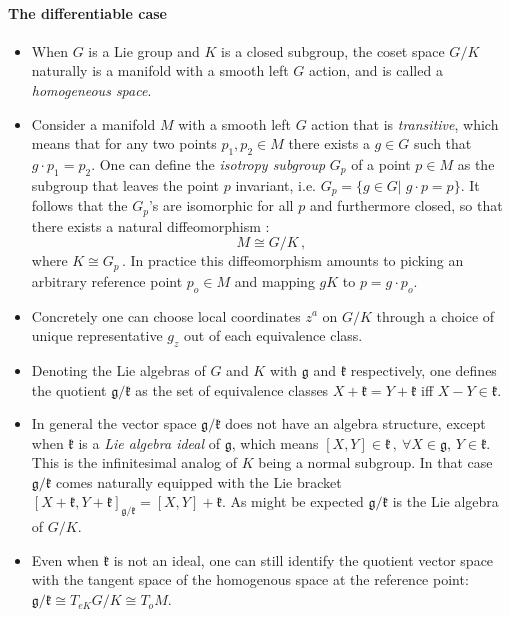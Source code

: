 \documentclass[11pt,a4paper]{article}
\begin{document}
    \paragraph{The differentiable case}
    \begin{itemize}
    	\item When $G$ is a Lie group and $K$ is a closed subgroup, the coset space $G/K$ naturally is a manifold with a smooth left $G$ action, and is called a {\it homogeneous space}.
    	
    	\item  Consider a manifold $M$ with a smooth left $G$ action that is {\it transitive}, which means that for any two points $p_1, p_2\in M$ there exists a $g\in G$ such that $g\cdot p_1=p_2$. One can define the {\it isotropy subgroup} $G_p$ of a point $p \in M$ as the subgroup that leaves the point $p$ invariant, i.e. $G_p=\{g\in G|\;g\cdot p=p\}$. It follows that the $G_p$'s are isomorphic for all $p$ and furthermore closed, so that there exists a natural diffeomorphism :
    	\begin{equation}
    	M\cong G/K\,,
    	\end{equation}
    	where $K\cong G_p$\,. In practice this diffeomorphism amounts to picking an arbitrary reference point $p_o\in M$ and mapping $gK$ to $p=g\cdot p_o$. 
    	\item Concretely one can choose local coordinates $z^a$ on $G/K$ through a choice of unique representative $g_z$ out of each equivalence class.
    	\item Denoting the Lie algebras of $G$ and $K$ with $\mathfrak{g}$ and $\mathfrak{k}$ respectively, one defines the quotient $\mathfrak{g}/\mathfrak{k}$ as the set of equivalence classes $X+\mathfrak{k}=Y+\mathfrak{k}$ iff $ X-Y \in \mathfrak{k}$.
    	\item In general the vector space $\mathfrak{g}/\mathfrak{k}$ does not have an algebra structure, except when $\mathfrak{k}$ is a {\it Lie algebra ideal} of $\mathfrak{g}$, which means $[X,Y]\in \mathfrak{k}\,,\ \forall X\in \mathfrak{g}$, $Y\in \mathfrak{k}$. This is the infinitesimal analog of $K$ being a normal subgroup. In that case $\mathfrak{g}/\mathfrak{k}$ comes naturally  equipped with the Lie bracket $[X+\mathfrak{k},Y+\mathfrak{k}]_{\mathfrak{g}/\mathfrak{k}}=[X,Y]+\mathfrak{k}$. As might be expected $\mathfrak{g}/\mathfrak{k}$ is the Lie algebra of $G/K$.
    	
    	\item Even when $\mathfrak{k}$ is not an ideal, one can still identify the quotient vector space with the tangent space of the homogenous space at the reference point: $\mathfrak{g}/\mathfrak{k}\cong T_{eK}G/K\cong T_oM$.
    	
    \end{itemize}
\end{document}
